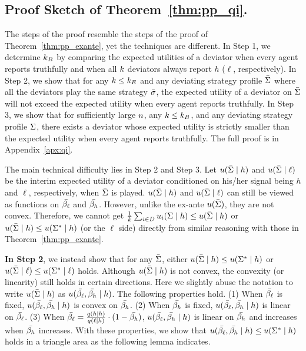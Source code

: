 \subsection{Proof Sketch of Theorem~\ref{thm:pp_qi}.}
The steps of the proof resemble the steps of the proof of Theorem~\ref{thm:pp_exante}, yet the techniques are different. In Step 1, we determine $k_B$ by comparing the \qi{} expected utilities of a deviator when every agent reports truthfully and when all $k$ deviators always report $h$ ($\ell$, respectively).
In Step 2, we show that for any $k \le k_E$ and any deviating strategy profile $\bar{\Sigma}$ where all the deviators play the same strategy $\bar{\sigma}$, the expected utility of a deviator on $\bar{\Sigma}$ will not exceed the expected utility when every agent reports truthfully. In Step 3, we show that for sufficiently large $n$, any $k \le k_B$, and any deviating strategy profile $\Sigma$, there exists a deviator whose expected utility is strictly smaller than the expected utility when every agent reports truthfully. The full proof is in Appendix~\ref{apx:qi}. 

The main technical difficulty lies in Step 2 and Step 3. Let $u(\bar{\Sigma} \mid h)$ and $u(\bar{\Sigma} \mid \ell)$ be the interim expected utility of a deviator conditioned on his/her signal being $h$ and $\ell$, respectively,  when $\bar{\Sigma}$ is played. $u(\bar{\Sigma} \mid h)$ and $u(\bar{\Sigma} \mid \ell)$ can still be viewed as functions on $\bar{\beta_{\ell}}$ and $\bar{\beta_{h}}$. However, unlike the ex-ante $u(\bar{\Sigma})$, they are not convex. Therefore, we cannot get $\frac{1}{k} \sum_{i \in D} u_i(\Sigma \mid h) \le u(\bar{\Sigma} \mid h)$ or $u(\bar{\Sigma} \mid h) \le u(\Sigma^* \mid h)$ (or the $\ell$ side) directly from similar reasoning with those in Theorem~\ref{thm:pp_exante}. 

\textbf{In Step 2}, we instead show that for any $\bar{\Sigma}$, either $u(\bar{\Sigma} \mid h) \le u(\Sigma^* \mid h)$ or $u(\bar{\Sigma} \mid \ell) \le u(\Sigma^* \mid \ell)$ holds. Although $u(\bar{\Sigma} \mid h)$ is not convex, the convexity (or linearity) still holds in certain directions. Here we slightly abuse the notation to write $u(\bar{\Sigma} \mid h)$ as $u(\bar{\beta_{\ell}}, \bar{\beta_{h}} \mid h)$. The following properties hold. (1) When $\bar{\beta_{\ell}}$ is fixed, $u(\bar{\beta_{\ell}}, \bar{\beta_{h}} \mid h)$ is convex on $\bar{\beta_{h}}$. (2) When $\bar{\beta_{h}}$ is fixed, $u(\bar{\beta_{\ell}}, \bar{\beta_{h}} \mid h)$ is linear on $\bar{\beta_{\ell}}$. (3) When $\bar{\beta_{\ell}} = \frac{q(h \mid h)}{q(\ell \mid h)}\cdot ( 1- \bar{\beta_{h}})$, $u(\bar{\beta_{\ell}}, \bar{\beta_{h}} \mid h)$ is linear on $\bar{\beta_{h}}$ and increases when $\bar{\beta_{h}}$ increases. With these properties, we show that $u(\bar{\beta_{\ell}}, \bar{\beta_{h}} \mid h) \le u(\Sigma^* \mid h)$ holds in a triangle area as the following lemma indicates.

